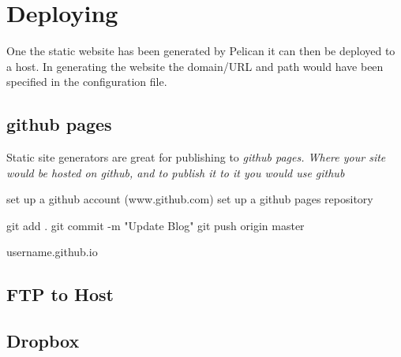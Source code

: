 \documentclass[]{report}   %
\begin{document}
\section{Deploying}
One the static website has been generated by Pelican it can then be deployed to a host. In generating the website the domain/URL and path would have been specified in the configuration file.
\subsection{github pages}
Static site generators are great for publishing to \it{github pages}.
Where your site would be hosted on github, and to publish it to it you would use github

set up a github account (www.github.com)
set up a github pages repository


git add .
git commit -m "Update Blog"
git push origin master

username.github.io

\subsection{FTP to Host}
\subsection{Dropbox}

\begin{thebibliography}{9}
\end{thebibliography}
\end{document}
